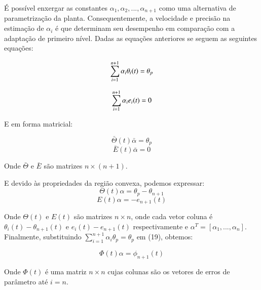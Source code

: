\documentclass[aspectratio=169]{beamer}
\begin{document}
\begin{frame}

É possível enxergar as constantes $\alpha_1,\alpha_2,...,\alpha_{n+1}$ como uma alternativa de parametrização da planta. Consequentemente, a velocidade e precisão na estimação de $\alpha_i$ é que determinam seu desempenho em comparação com a adaptação de primeiro nível. Dadas as equações anteriores se seguem as seguintes equações:
\centering
\begin{minipage}{.48\textwidth}
  \centering
  \begin{equation}
  \sum_{i=1}^{n+1}\alpha_i\theta_i(t) = \theta_p \space 
  \end{equation}
\end{minipage}%
  \hfill

\begin{minipage}{.48\textwidth}
  \centering
    \begin{equation}
    \sum_{i=1}^{n+1}\alpha_i e_i(t) = 0 \space
    \end{equation}
\end{minipage}

\end{frame}

\begin{frame}
E em forma matricial:

\begin{equation}
\bar{\Theta}(t)\bar{\alpha} = \theta_p
\end{equation}
\begin{equation}
\bar{E}(t)\bar{\alpha} = 0
\end{equation}

Onde $\bar{\Theta}$ e $\bar{E}$ são matrizes $n\times(n+1)$.

\end{frame}

\begin{frame}
E devido às propriedades da região convexa, podemos expressar:
\begin{equation}
\Theta(t)\alpha = \theta_p - \theta_{n+1}
\end{equation}
\begin{equation}
E(t)\alpha = -e_{n+1}(t)
\end{equation}

Onde $\Theta(t)$ e $E(t)$ são matrizes $n\times n$, onde cada vetor coluna é $\theta_i(t)-\theta_{n+1}(t)$ e $e_i(t)-e_{n+1}(t)$ respectivamente e $\alpha^T = [\alpha_1,...,\alpha_n]$. Finalmente, substituindo $\sum_{i=1}^{n+1}\alpha_i\theta_p = \theta_p$ em (19), obtemos:

\begin{equation}
\Phi(t)\alpha = \phi_{n+1}(t)
\end{equation}

Onde $\Phi(t)$ é uma matriz $n\times n$ cujas colunas são os vetores de erros de parâmetro até $i=n$.

\end{frame}
\end{document}
